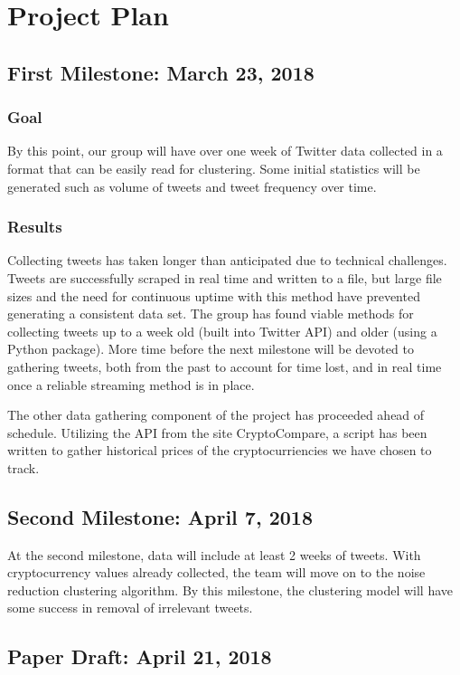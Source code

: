 \documentclass[sigconf]{acmart}
\begin{document}
\section{Project Plan}
\subsection{First Milestone: March 23, 2018}
\subsubsection{Goal}
By this point, our group will have over one week of Twitter data collected in a format that can be easily read for clustering. Some initial statistics will be generated such as volume of tweets and tweet frequency over time.

\subsubsection{Results}

Collecting tweets has taken longer than anticipated due to technical challenges. Tweets are successfully scraped in real time and written to a file, but large file sizes and the need for continuous uptime with this method have prevented generating a consistent data set. The group has found viable methods for collecting tweets up to a week old (built into Twitter API) and older (using a Python package). More time before the next milestone will be devoted to gathering tweets, both from the past to account for time lost, and in real time once a reliable streaming method is in place.

The other data gathering component of the project has proceeded ahead of schedule. Utilizing the API from the site CryptoCompare, a script has been written to gather historical prices of the cryptocurriencies we have chosen to track.

\subsection{Second Milestone: April 7, 2018}

At the second milestone, data will include at least 2 weeks of
tweets. With cryptocurrency values already collected, the team will move on to the noise reduction clustering algorithm. By this milestone, the clustering model will have some success in removal of irrelevant tweets.

\subsection{Paper Draft: April 21, 2018}
\end{document}
